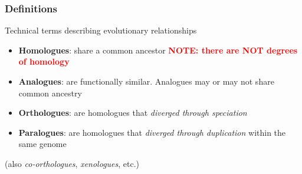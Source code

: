 %
\begin{frame}
  \frametitle{Definitions
  }
  Technical terms describing evolutionary relationships
  \begin{itemize}
    \item \textbf{\textcolor{hutton_blue}{Homologues}}: share a common ancestor \textcolor{red}{\textbf{NOTE: there are NOT degrees of homology}}
    \item \textbf{\textcolor{hutton_blue}{Analogues}}: are functionally similar. Analogues may or may not share common ancestry
    \item \textbf{\textcolor{hutton_green}{Orthologues}}: are homologues that \textit{diverged through speciation}
    \item \textbf{\textcolor{hutton_purple}{Paralogues}}: are homologues that \textit{diverged through duplication} within the same genome
  \end{itemize}
  (also \textit{co-orthologues}, \textit{xenologues}, etc.)
\end{frame}